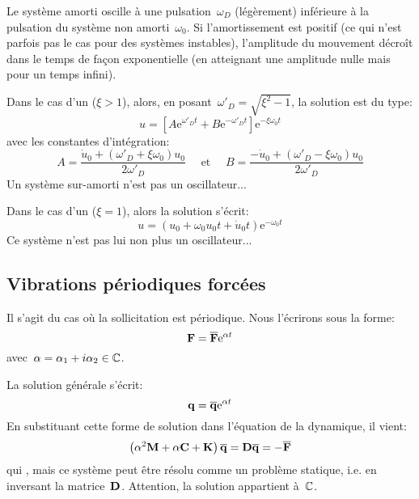 Le système amorti oscille à une pulsation~$\omega_D$ (légèrement) inférieure à la pulsation du
système non amorti~$\omega_0$. Si l'amortissement est positif (ce qui n’est parfois pas le cas
pour des systèmes instables), l'amplitude du mouvement décroît dans le temps de façon
exponentielle (en atteignant une amplitude nulle mais pour un temps infini).

\medskip
Dans le cas d'un  ($\xi>1$), alors, en posant~$\omega'_D=\sqrt{\xi^2-1}$, la solution est du type:
\begin{equation} u=\left[A\mathrm{e}^{\omega'_D t}+B\mathrm{e}^{-\omega'_D t}\right] \mathrm{e}^{-\xi\omega_0t} \end{equation}
avec les constantes d'intégration:
\begin{equation}A=\dfrac{\dot{u}_0+(\omega'_D+\xi\omega_0)u_0}{2\omega'_D} \quad \text{ et }\quad
B=\dfrac{-\dot{u}_0+(\omega'_D-\xi\omega_0)u_0}{2\omega'_D} \end{equation}
Un système sur-amorti n'est pas un oscillateur...

\medskip
Dans le cas d'un  ($\xi=1$), alors la solution s'écrit:
\begin{equation}
u = (u_0+\omega_0u_0t+\dot{u}_0t)\mathrm{e}^{-\omega_0 t}
\end{equation}
Ce système n'est pas lui non plus un oscillateur...




\medskip{}
\subsection{Vibrations périodiques forcées}

Il s'agit du cas où la sollicitation est périodique. Nous l'écrirons sous la forme:
\begin{equation} \VV{F}=\VV{\overline{F}}\mathrm{e}^{\alpha t} \end{equation}
avec~$\alpha=\alpha_1+i\alpha_2\in\mathbb C$.

La solution générale s'écrit:
\begin{equation} \VV{q}=\VV{\overline{q}}\mathrm{e}^{\alpha t} \end{equation}
En substituant cette forme de solution dans l'équation de la dynamique, il vient:
\begin{equation} \left(\alpha^2\MM{M}+\alpha\MM{C}+\MM{K}\right)\VV{\overline{q}}=\MM{D}\VV{\overline{q}}=-\VV{\overline{F}} \end{equation}
qui , mais ce système peut être résolu
comme un problème statique, i.e. en inversant la matrice~$\MM{D}$. Attention, la solution appartient à~$\mathbb C$.

